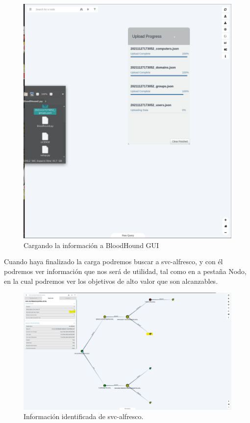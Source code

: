 \documentclass{article}
\begin{document}
\begin{figure}[H]
	\center
	\includegraphics[width=\textwidth/2]{images/forest/CargandoLosJson.png}
	\caption{Cargando la información a BloodHound GUI}
\end{figure}

Cuando haya finalizado la carga podremos buscar a svc-alfresco, y con él podremos ver información que nos será de utilidad, tal como en a pestaña Nodo, en la cual podremos ver los objetivos de alto valor que son alcanzables. 

\begin{figure}[H]
	\center
	\includegraphics[width=\textwidth]{images/forest/pertenencia_al_grupo_operators.png}
	\caption{Información identificada de svc-alfresco.}
\end{figure}
\end{document}
